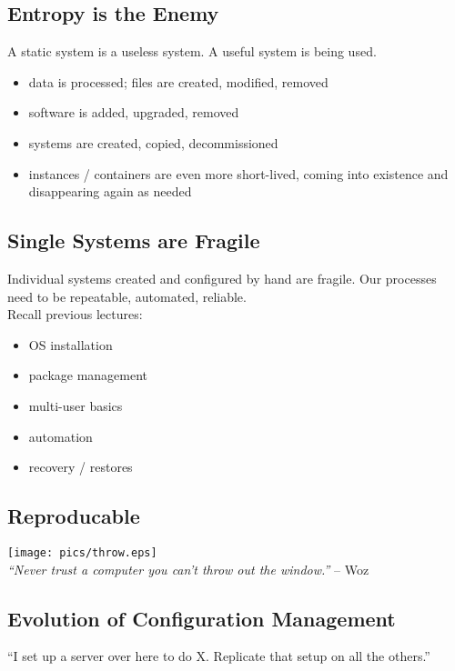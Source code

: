 \documentclass[xga]{xdvislides}
\begin{document}
\subsection{Entropy is the Enemy}
A static system is a useless system.
A useful system is being used.
\vspace{.5in}
\begin{itemize}
	\item data is processed; files are created, modified, removed
	\item software is added, upgraded, removed
	\item systems are created, copied, decommissioned
	\item instances / containers are even more short-lived,
		coming into existence and disappearing again as needed
\end{itemize}

\subsection{Single Systems are Fragile}
Individual systems created and configured by hand are
fragile.  Our processes need to be repeatable,
automated, reliable. \\

Recall previous lectures:

\begin{itemize}
	\item OS installation
	\item package management
	\item multi-user basics
	\item automation
	\item recovery / restores
\end{itemize}

\subsection{Reproducable}
\vspace*{\fill}
\begin{center}
	\texttt{[image: pics/throw.eps]} \\
	\vspace*{\fill}
	{\em ``Never trust a computer you can't throw out the
window.''} -- Woz
\end{center}

\subsection{Evolution of Configuration Management}
``I set up a server over here to do X.  Replicate that
setup on all the others.'' \\
\end{document}
